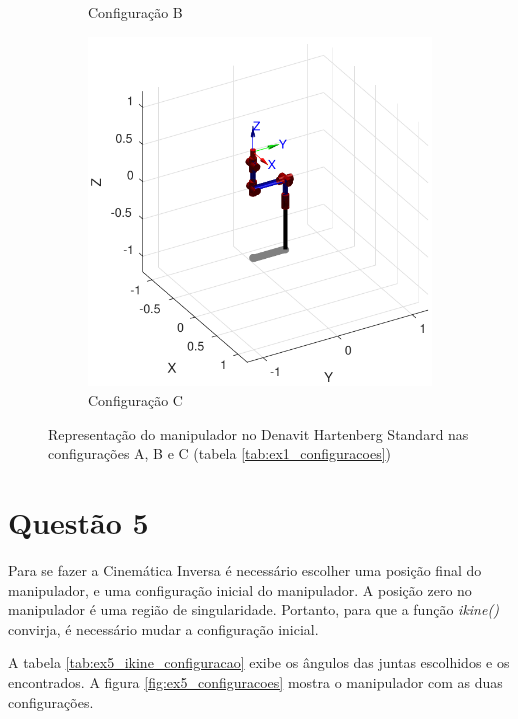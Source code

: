 \documentclass[a4paper,11pt]{article}
\theoremstyle{mytheor}
\begin{document}
\begin{figure}[!ht]
\begin{minipage}{\linewidth}
\begin{subfigure}[b]{0.45\textwidth}
    \caption{Configuração B}
    \end{subfigure}
  \end{minipage}
  \begin{minipage}{\linewidth}
  \centering
    \begin{subfigure}[b]{0.45\textwidth}
    \includegraphics[width=1\textwidth]{figs/ex4_c.pdf}
    \caption{Configuração C}
    \end{subfigure}
  \end{minipage}
\caption{Representação do manipulador no Denavit Hartenberg Standard nas configurações A, B e C (tabela \ref{tab:ex1_configuracoes})}
\label{fig:ex4_configuracoes}
\end{figure}


\section*{Questão 5}

Para se fazer a Cinemática Inversa é necessário escolher uma posição final do manipulador, e uma configuração inicial do manipulador. A posição zero no manipulador é uma região de singularidade. Portanto, para que a função \textit{ikine()} convirja, é necessário mudar a configuração inicial. 

A tabela \ref{tab:ex5_ikine_configuracao} exibe os ângulos das juntas escolhidos e os encontrados. A figura \ref{fig:ex5_configuracoes} mostra o manipulador com as duas configurações.
\end{document}
